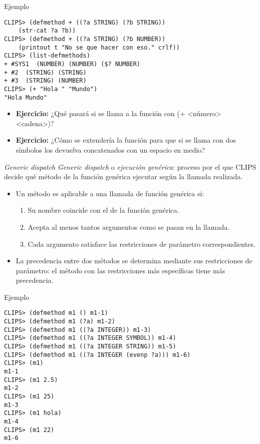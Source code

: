 \documentclass[usenames,dvipsnames,aspectratio=169]{beamer}
\begin{document}
\begin{frame}[fragile]{Ejemplo}
	\begin{verbatim}
CLIPS> (defmethod + ((?a STRING) (?b STRING))
    (str-cat ?a ?b))
CLIPS> (defmethod + ((?a STRING) (?b NUMBER))
    (printout t "No se que hacer con eso." crlf))
CLIPS> (list-defmethods)
+ #SYS1  (NUMBER) (NUMBER) ($? NUMBER)
+ #2  (STRING) (STRING)
+ #3  (STRING) (NUMBER)
CLIPS> (+ "Hola " "Mundo")
"Hola Mundo"
	\end{verbatim}
	\begin{itemize}
		\item \textbf{Ejercicio:} ¿Qué pasará si se llama a la función con (+ <número> <cadena>)?
		\item \textbf{Ejercicio:} ¿Cómo se extendería la función para que si se llama con dos símbolos los devuelva concatenados con un espacio en medio?
	\end{itemize}
\end{frame}

\begin{frame}{\textit{Generic dispatch}}
	\textit{Generic dispatch} o \textit{ejecución genérica}: proceso por el que CLIPS decide qué método de la función genérica ejecutar según la llamada realizada.
	\begin{itemize}
		\item Un método es aplicable a una llamada de función genérica si:
		\begin{enumerate}
			\item Su nombre coincide con el de la función genérica.
			\item Acepta al menos tantos argumentos como se pasan en la llamada.
			\item Cada argumento satisface las restricciones de parámetro correspondientes.
		\end{enumerate}
		\item La precedencia entre dos métodos se determina mediante sus restricciones de parámetro: el método con las restricciones más específicas tiene más precedencia.
	\end{itemize}
\end{frame}

\begin{frame}[fragile]{Ejemplo}
	\small
	\begin{verbatim}
CLIPS> (defmethod m1 () m1-1)
CLIPS> (defmethod m1 (?a) m1-2)
CLIPS> (defmethod m1 ((?a INTEGER)) m1-3)
CLIPS> (defmethod m1 ((?a INTEGER SYMBOL)) m1-4)
CLIPS> (defmethod m1 ((?a INTEGER STRING)) m1-5)
CLIPS> (defmethod m1 ((?a INTEGER (evenp ?a))) m1-6)
CLIPS> (m1)
m1-1
CLIPS> (m1 2.5)
m1-2
CLIPS> (m1 25)
m1-3
CLIPS> (m1 hola)
m1-4
CLIPS> (m1 22)
m1-6
	\end{verbatim}
\end{frame}
\end{document}
